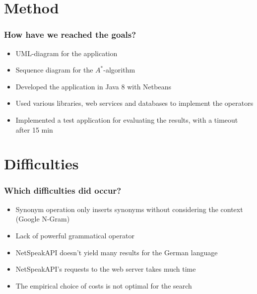 \documentclass{beamer}
\begin{document}
\section{Method}
\begin{frame}
\frametitle{How have we reached the goals?}
\begin{itemize}
	\item UML-diagram for the application
	\item Sequence diagram for the $A^*$-algorithm
	\item Developed the application in Java 8 with Netbeans
	\item Used various libraries, web services and databases to implement
	the operators
	\item Implemented a test application for evaluating the results, with
	a timeout after 15 min

	
	
\end{itemize}
\end{frame}


\section{Difficulties}
\begin{frame}
\frametitle{Which difficulties did occur?}
\begin{itemize}
	\item Synonym operation only inserts synonyms without considering
	the context (Google N-Gram)
	\item Lack of powerful grammatical operator
	\item NetSpeakAPI doesn't yield many results for the German language
	\item NetSpeakAPI's requests to the web server takes much time
	\item The empirical choice of costs is not optimal for the search
\end{itemize}
\end{frame}
\end{document}
